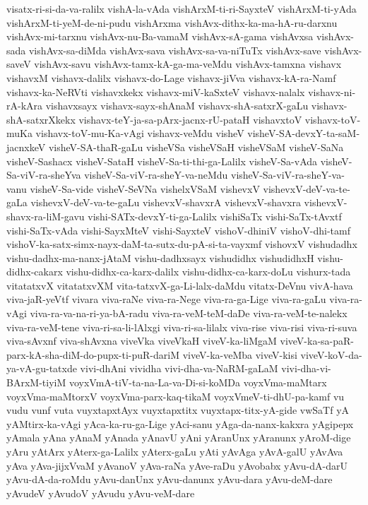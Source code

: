 {visatx-ri-si-da-va-ralilx
vishA-la-vAda
vishArxM-ti-ri-SayxteV
vishArxM-ti-yAda
vishArxM-ti-yeM-de-ni-pudu
vishArxma
vishAvx-dithx-ka-ma-hA-ru-darxnu
vishAvx-mi-tarxnu
vishAvx-nu-Ba-vamaM
vishAvx-sA-gama
vishAvxsa
vishAvx-sada
vishAvx-sa-diMda
vishAvx-sava
vishAvx-sa-va-niTuTx
vishAvx-save
vishAvx-saveV
vishAvx-savu
vishAvx-tamx-kA-ga-ma-veMdu
vishAvx-tamxna
vishavx
vishavxM
vishavx-dalilx
vishavx-do-Lage
vishavx-jiVva
vishavx-kA-ra-Namf
vishavx-ka-NeRVti
vishavxkekx
vishavx-miV-kaSxteV
vishavx-nalalx
vishavx-ni-rA-kAra
vishavxsayx
vishavx-sayx-shAnaM
vishavx-shA-satxrX-gaLu
vishavx-shA-satxrXkekx
vishavx-teY-ja-sa-pArx-jacnx-rU-pataH
vishavxtoV
vishavx-toV-muKa
vishavx-toV-mu-Ka-vAgi
vishavx-veMdu
visheV
visheV-SA-devxY-ta-saM-jacnxkeV
visheV-SA-thaR-gaLu
visheVSa
visheVSaH
visheVSaM
visheV-SaNa
visheV-Sashacx
visheV-SataH
visheV-Sa-ti-thi-ga-Lalilx
visheV-Sa-vAda
visheV-Sa-viV-ra-sheYva
visheV-Sa-viV-ra-sheY-va-neMdu
visheV-Sa-viV-ra-sheY-va-vanu
visheV-Sa-vide
visheV-SeVNa
vishelxVSaM
vishevxV
vishevxV-deV-va-te-gaLa
vishevxV-deV-va-te-gaLu
vishevxV-shavxrA
vishevxV-shavxra
vishevxV-shavx-ra-liM-gavu
vishi-SATx-devxY-ti-ga-Lalilx
vishiSaTx
vishi-SaTx-tAvxtf
vishi-SaTx-vAda
vishi-SayxMteV
vishi-SayxteV
vishoV-dhiniV
vishoV-dhi-tamf
vishoV-ka-satx-simx-nayx-daM-ta-sutx-du-pA-si-ta-vayxmf
vishovxV
vishudadhx
vishu-dadhx-ma-nanx-jAtaM
vishu-dadhxsayx
vishudidhx
vishudidhxH
vishu-didhx-cakarx
vishu-didhx-ca-karx-dalilx
vishu-didhx-ca-karx-doLu
vishurx-tada
vitatatxvX
vitatatxvXM
vita-tatxvX-ga-Li-lalx-daMdu
vitatx-DeVnu
vivA-hava
viva-jaR-yeVtf
vivara
viva-raNe
viva-ra-Nege
viva-ra-ga-Lige
viva-ra-gaLu
viva-ra-vAgi
viva-ra-va-na-ri-ya-bA-radu
viva-ra-veM-teM-daDe
viva-ra-veM-te-nalekx
viva-ra-veM-tene
viva-ri-sa-li-lAlxgi
viva-ri-sa-lilalx
viva-rise
viva-risi
viva-ri-suva
viva-sAvxnf
viva-shAvxna
viveVka
viveVkaH
viveV-ka-liMgaM
viveV-ka-sa-paR-parx-kA-sha-diM-do-pupx-ti-puR-dariM
viveV-ka-veMba
viveV-kisi
viveV-koV-da-ya-vA-gu-tatxde
vivi-dhAni
vividha
vivi-dha-va-NaRM-gaLaM
vivi-dha-vi-BArxM-tiyiM
voyxVmA-tiV-ta-na-La-va-Di-si-koMDa
voyxVma-maMtarx
voyxVma-maMtorxV
voyxVma-parx-kaq-tikaM
voyxVmeV-ti-dhU-pa-kamf
vu
vudu
vunf
vuta
vuyxtapxtAyx
vuyxtapxtitx
vuyxtapx-titx-yA-gide
vwSaTf
yA
yAMtirx-ka-vAgi
yAca-ka-ru-ga-Lige
yAci-sanu
yAga-da-nanx-kakxra
yAgipepx
yAmala
yAna
yAnaM
yAnada
yAnavU
yAni
yAranUnx
yAranunx
yAroM-dige
yAru
yAtArx
yAterx-ga-Lalilx
yAterx-gaLu
yAti
yAvAga
yAvA-galU
yAvAva
yAva
yAva-jijxVvaM
yAvanoV
yAva-raNa
yAve-raDu
yAvobabx
yAvu-dA-darU
yAvu-dA-da-roMdu
yAvu-danUnx
yAvu-danunx
yAvu-dara
yAvu-deM-dare
yAvudeV
yAvudoV
yAvudu
yAvu-veM-dare
}
